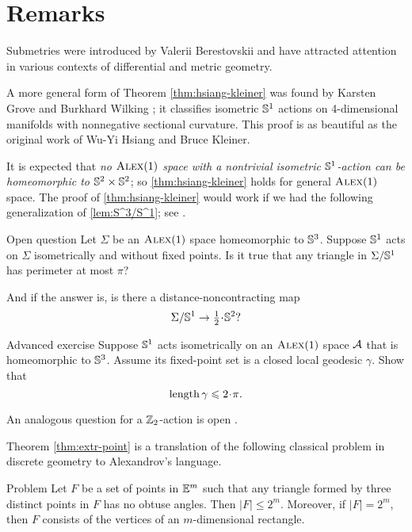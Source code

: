 \section{Remarks}

Submetries were introduced by Valerii Berestovskii \cite{berestovskii1987} and have attracted attention in various contexts of differential and metric geometry.



A more general form of Theorem \ref{thm:hsiang-kleiner} was found by Karsten Grove and Burkhard Wilking \cite{grove-wilking};
it classifies isometric $\mathbb{S}^1$ actions on  4-dimensional manifolds with nonnegative sectional curvature.
This proof is as beautiful as the original work of Wu-Yi Hsiang and Bruce Kleiner.

It is expected that \textit{no $\textsc{Alex}(1)$ space with a nontrivial isometric $\mathbb{S}^1$-action can be homeomorphic to $\mathbb{S}^2\times\mathbb{S}^2$};
so \ref{thm:hsiang-kleiner} holds for general $\textsc{Alex}(1)$ space.
The proof of \ref{thm:hsiang-kleiner} would work if we had the following generalization of \ref{lem:S^3/S^1};
see \cite{harvey-searle}.

\begin{thm}{Open question}
Let $\Sigma$ be an $\textsc{Alex}(1)$ space homeomorphic to $\mathbb{S}^3$.
Suppose $\mathbb{S}^1$ acts on $\Sigma$ isometrically and without fixed points.
Is it true that any triangle in $\Sigma/\mathbb{S}^1$ has perimeter at most $\pi$?

And if the answer is, is there a distance-noncontracting map
\[\Sigma/\SSS^1\z\to \tfrac12\cdot\SSS^2?\]
\end{thm}


\begin{thm}{Advanced exercise}\label{ex:S1actsS3}
Suppose $\mathbb{S}^1$ acts isometrically on an $\textsc{Alex}(1)$ space $\mathcal{A}$ that is homeomorphic to $\mathbb{S}^3$.
Assume its fixed-point set is a closed local geodesic $\gamma$.
Show that
\[\length\gamma\le2\cdot\pi.\]
\end{thm}

An analogous question for a $\mathbb{Z}_2$-action is open \cite{petrunin-involution}.

Theorem \ref{thm:extr-point} is a translation of the following classical problem in discrete geometry to Alexandrov's language.

\begin{thm}{Problem}\label{erdos-problem}
Let $F$ be a set of points in $\mathbb{E}^m$ such that any triangle formed by three distinct points in $F$ has no obtuse angles.
Then  $|F|\le2^m$.
Moreover, if $|F|=2^m$, then $F$ consists of the vertices of an $m$-dimensional rectangle.
\end{thm}

